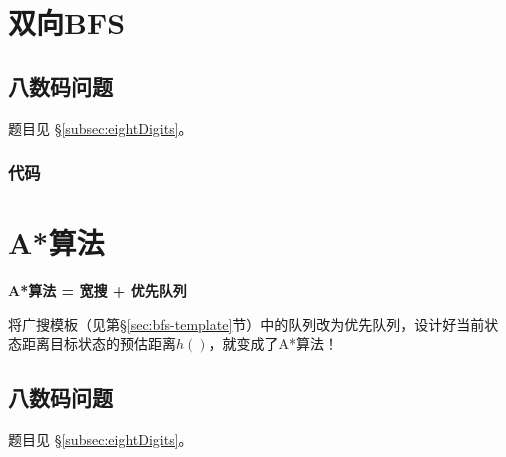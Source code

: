 \section{双向BFS} %
\label{sec:biBFS}


\subsection{八数码问题}
题目见 \S \ref{subsec:eightDigits}。

\subsubsection{代码}

\begin{Codex}[label=eight_digits_bibfs.c]

\end{Codex}


\section{A*算法} %
\label{sec:astar}

\textbf{A*算法 = 宽搜 + 优先队列}

将广搜模板（见第\S \ref{sec:bfs-template}节）中的队列改为优先队列，设计好当前状态距离目标状态的预估距离$h()$，就变成了A*算法！

\subsection{八数码问题}
题目见 \S \ref{subsec:eightDigits}。

